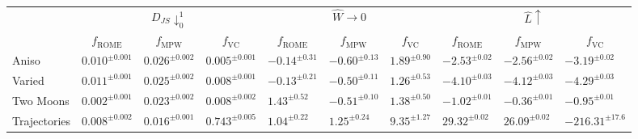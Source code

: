 \begin{tabularx}{\textwidth}{X | Y Y Y | Y Y Y | Y Y Y}
\toprule[1pt] 
&  &  &   \\&  &  &  &  &  &  &  &  &   \\ \midrule[1pt]
Aniso & {\scriptsize $0.010^{\pm 0.001}$} & {\scriptsize $0.026^{\pm 0.002}$} & {\scriptsize $0.005^{\pm 0.001}$} & {\scriptsize $-0.14^{\pm 0.31}$} & {\scriptsize $-0.60^{\pm 0.13}$} & {\scriptsize $1.89^{\pm 0.90}$} & {\scriptsize $-2.53^{\pm 0.02}$} & {\scriptsize $-2.56^{\pm 0.02}$} & {\scriptsize $-3.19^{\pm 0.02}$}  \\ \midrule 
Varied & {\scriptsize $0.011^{\pm 0.001}$} & {\scriptsize $0.025^{\pm 0.002}$} & {\scriptsize $0.008^{\pm 0.001}$} & {\scriptsize $-0.13^{\pm 0.21}$} & {\scriptsize $-0.50^{\pm 0.11}$} & {\scriptsize $1.26^{\pm 0.53}$} & {\scriptsize $-4.10^{\pm 0.03}$} & {\scriptsize $-4.12^{\pm 0.03}$} & {\scriptsize $-4.29^{\pm 0.03}$}  \\ \midrule 
Two Moons & {\scriptsize $0.002^{\pm 0.001}$} & {\scriptsize $0.023^{\pm 0.002}$} & {\scriptsize $0.008^{\pm 0.002}$} & {\scriptsize $1.43^{\pm 0.52}$} & {\scriptsize $-0.51^{\pm 0.10}$} & {\scriptsize $1.38^{\pm 0.50}$} & {\scriptsize $-1.02^{\pm 0.01}$} & {\scriptsize $-0.36^{\pm 0.01}$} & {\scriptsize $-0.95^{\pm 0.01}$}  \\ \midrule 
Trajectories & {\scriptsize $0.008^{\pm 0.002}$} & {\scriptsize $0.016^{\pm 0.001}$} & {\scriptsize $0.743^{\pm 0.005}$} & {\scriptsize $1.04^{\pm 0.22}$} & {\scriptsize $1.25^{\pm 0.24}$} & {\scriptsize $9.35^{\pm 1.27}$} & {\scriptsize $29.32^{\pm 0.02}$} & {\scriptsize $26.09^{\pm 0.02}$} & {\scriptsize $-216.31^{\pm 17.6}$}  \\ \bottomrule[1pt]
\end{tabularx} 

